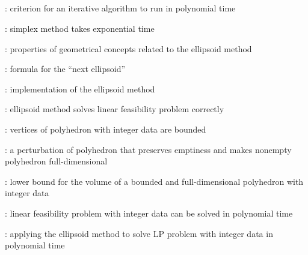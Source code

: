 \subsection*{}
\item {}: criterion for an iterative algorithm to run in polynomial time
\item {}: simplex method takes exponential time
\item {}: properties of geometrical concepts related to the ellipsoid method
\item {}: formula for the ``next ellipsoid''
\item {}: implementation of the ellipsoid method
\item {}: ellipsoid method solves linear feasibility problem correctly
\item {}: vertices of polyhedron with integer data are bounded
\item {}: a perturbation of polyhedron that preserves emptiness and makes nonempty polyhedron full-dimensional
\item {}: lower bound for the volume of a bounded and full-dimensional polyhedron with integer data
\item {}: linear feasibility problem with integer data can be solved in polynomial time
\item {}: applying the ellipsoid method to solve LP problem with integer data in polynomial time
